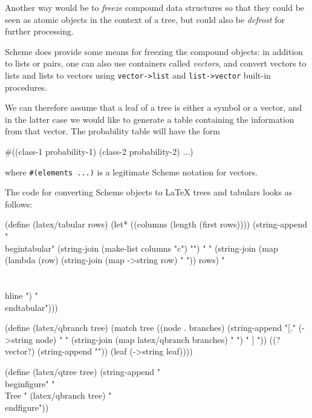 Another way would be to \textit{freeze} compound data structures
so that they could be seen as atomic objects in the context
of a tree, but could also be \textit{defrost} for further
processing.

Scheme does provide some means for freezing the compound
objects: in addition to lists or pairs, one can also use
containers called \textit{vectors}, and convert vectors
to lists and lists to vectors using \texttt{vector->list}
and \texttt{list->vector} built-in procedures.

We can therefore assume that a leaf of a tree is either
a symbol or a vector, and in the latter case we would
like to generate a table containing the information from
that vector. The probability table will have the form

\begin{Snippet}
#((class-1 probability-1)
  (class-2 probability-2)
  ...)
\end{Snippet}

where \texttt{\#(elements ...)} is a legitimate Scheme
notation for vectors.

The code for converting Scheme objects to \LaTeX{} trees
and tabulars looks as follows:

\begin{Snippet}
(define (latex/tabular rows)
  (let* ((columns (length (first rows))))
    (string-append
     "\\begin{tabular}{"
     (string-join (make-list columns "c") "")
     "} "
     (string-join 
      (map (lambda (row)
	     (string-join (map ->string row) " "))
	   rows)
      " \\\\ \\hline ")
     " \\end{tabular}")))
\end{Snippet}
\begin{Snippet}
(define (latex/qbranch tree)
  (match tree
    ((node . branches)
     (string-append 
      "[." (->string node) " "
      (string-join (map latex/qbranch branches) " ")
      " ] "))
    ((? vector?)
     (string-append 
      " "))
    (leaf
     (->string leaf))))
\end{Snippet}
\begin{Snippet}
(define (latex/qtree tree)
 (string-append 
  "\\begin{figure}"
  "\\Tree "
  (latex/qbranch tree)
  "\\end{figure}"))
\end{Snippet}

